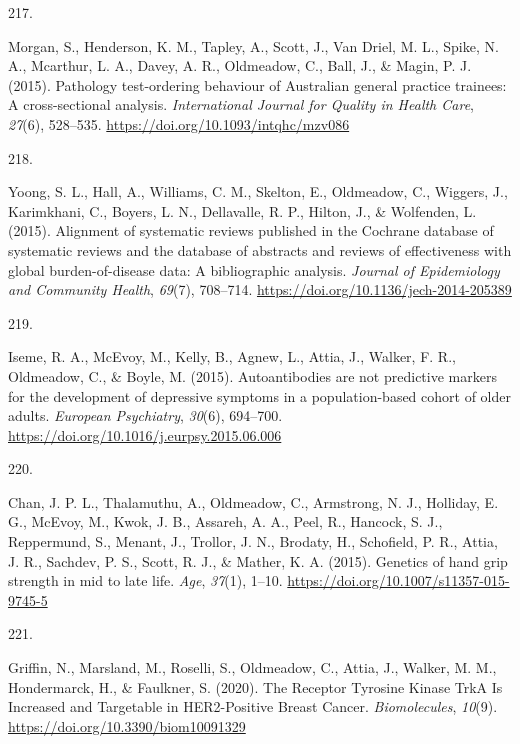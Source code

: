 \documentclass[11pt, a4paper]{awesome-cv}
\newlength{\csllabelwidth}
\newcommand{\CSLLeftMargin}[1]{\parbox[t]{\csllabelwidth}{#1}}
\newcommand{\CSLRightInline}[1]{\parbox[t]{\linewidth - \csllabelwidth}{#1}}
\begin{document}
\leavevmode\hypertarget{ref-morgan_pathology_2015}{}%
\CSLLeftMargin{217. }
\CSLRightInline{Morgan, S., Henderson, K. M., Tapley, A., Scott, J., Van
Driel, M. L., Spike, N. A., Mcarthur, L. A., Davey, A. R., Oldmeadow,
C., Ball, J., \& Magin, P. J. (2015). Pathology test-ordering behaviour
of Australian general practice trainees: A cross-sectional analysis.
\emph{International Journal for Quality in Health Care}, \emph{27}(6),
528--535. \url{https://doi.org/10.1093/intqhc/mzv086}}

\leavevmode\hypertarget{ref-yoong_alignment_2015}{}%
\CSLLeftMargin{218. }
\CSLRightInline{Yoong, S. L., Hall, A., Williams, C. M., Skelton, E.,
Oldmeadow, C., Wiggers, J., Karimkhani, C., Boyers, L. N., Dellavalle,
R. P., Hilton, J., \& Wolfenden, L. (2015). Alignment of systematic
reviews published in the Cochrane database of systematic reviews and the
database of abstracts and reviews of effectiveness with global
burden-of-disease data: A bibliographic analysis. \emph{Journal of
Epidemiology and Community Health}, \emph{69}(7), 708--714.
\url{https://doi.org/10.1136/jech-2014-205389}}

\leavevmode\hypertarget{ref-iseme_autoantibodies_2015}{}%
\CSLLeftMargin{219. }
\CSLRightInline{Iseme, R. A., McEvoy, M., Kelly, B., Agnew, L., Attia,
J., Walker, F. R., Oldmeadow, C., \& Boyle, M. (2015). Autoantibodies
are not predictive markers for the development of depressive symptoms in
a population-based cohort of older adults. \emph{European Psychiatry},
\emph{30}(6), 694--700.
\url{https://doi.org/10.1016/j.eurpsy.2015.06.006}}

\leavevmode\hypertarget{ref-chan_genetics_2015}{}%
\CSLLeftMargin{220. }
\CSLRightInline{Chan, J. P. L., Thalamuthu, A., Oldmeadow, C.,
Armstrong, N. J., Holliday, E. G., McEvoy, M., Kwok, J. B., Assareh, A.
A., Peel, R., Hancock, S. J., Reppermund, S., Menant, J., Trollor, J.
N., Brodaty, H., Schofield, P. R., Attia, J. R., Sachdev, P. S., Scott,
R. J., \& Mather, K. A. (2015). Genetics of hand grip strength in mid to
late life. \emph{Age}, \emph{37}(1), 1--10.
\url{https://doi.org/10.1007/s11357-015-9745-5}}

\leavevmode\hypertarget{ref-griffin_receptor_2020}{}%
\CSLLeftMargin{221. }
\CSLRightInline{Griffin, N., Marsland, M., Roselli, S., Oldmeadow, C.,
Attia, J., Walker, M. M., Hondermarck, H., \& Faulkner, S. (2020). The
Receptor Tyrosine Kinase TrkA Is Increased and Targetable in
HER2-Positive Breast Cancer. \emph{Biomolecules}, \emph{10}(9).
\url{https://doi.org/10.3390/biom10091329}}
\end{document}

